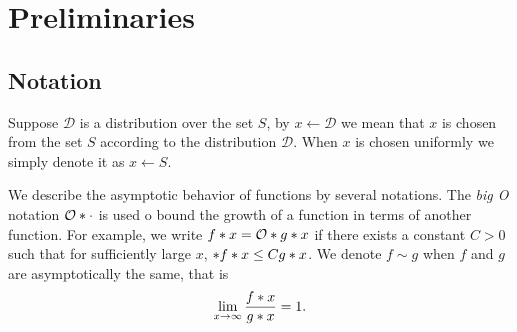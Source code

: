\section{Preliminaries}
\subsection{Notation}
Suppose \(\mathcal{D}\) is a distribution over the set \(S\), by \(x \gets \mathcal{D}\) we mean that \(x\) is chosen from the set \(S\) according to the distribution \(\mathcal{D}\). When \(x\) is chosen uniformly we simply denote it as \(x \gets S\).

We describe the asymptotic behavior of functions by several notations. The \textit{big O} notation \(\bigO{\cdot}\) is used o bound the growth of a function in terms of another function. For example, we write \(\func{f}{x} = \bigO{\func{g}{x}}\) if there exists a constant \(C > 0\) such that for sufficiently large \(x\), \(\abs{\func{f}{x}} \leq C\func{g}{x}\). We denote \(f \sim g\) when \(f\) and \(g\) are asymptotically the same, that is 
\begin{equation}
    \lim_{x\to \infty} \dfrac{\func{f}{x}}{\func{g}{x}} = 1.
\end{equation}


